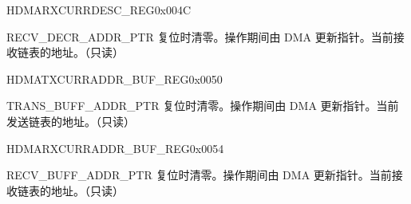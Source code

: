 \begin{register}{H}{DMARXCURRDESC\_REG}{0x004C}\label{regdesc:DMARXCURRDESCREG}
%
\regnewline%
\begin{regdesc}\begin{reglist}
\item [RECV\_DECR\_ADDR\_PTR] 复位时清零。操作期间由 DMA 更新指针。当前接收链表的地址。（只读）
\end{reglist}\end{regdesc}
\end{register}


\begin{register}{H}{DMATXCURRADDR\_BUF\_REG}{0x0050}\label{regdesc:DMATXCURRADDRBUFREG}
%
\regnewline%
\begin{regdesc}\begin{reglist}
\item [TRANS\_BUFF\_ADDR\_PTR] 复位时清零。操作期间由 DMA 更新指针。当前发送链表的地址。（只读）
\end{reglist}\end{regdesc}
\end{register}

\begin{register}{H}{DMARXCURRADDR\_BUF\_REG}{0x0054}\label{regdesc:DMARXCURRADDRBUFREG}
%
\regnewline%
\begin{regdesc}\begin{reglist}
\item [RECV\_BUFF\_ADDR\_PTR] 复位时清零。操作期间由 DMA 更新指针。当前接收链表的地址。（只读）
\end{reglist}\end{regdesc}
\end{register}



